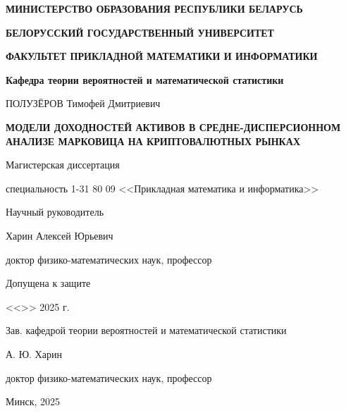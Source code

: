 \begin{titlepage}
    \begin{center}
       \textbf{МИНИСТЕРСТВО ОБРАЗОВАНИЯ РЕСПУБЛИКИ БЕЛАРУСЬ}

       \textbf{БЕЛОРУССКИЙ ГОСУДАРСТВЕННЫЙ УНИВЕРСИТЕТ}

       \textbf{ФАКУЛЬТЕТ ПРИКЛАДНОЙ МАТЕМАТИКИ И ИНФОРМАТИКИ}

       \textbf{Кафедра теории вероятностей и математической статистики}
    \end{center}

    \vspace{15pt}

    \begin{center}
        ПОЛУЗЁРОВ Тимофей Дмитриевич
    \end{center}

    \begin{center}
        \textbf{МОДЕЛИ ДОХОДНОСТЕЙ АКТИВОВ В СРЕДНЕ-ДИСПЕРСИОННОМ АНАЛИЗЕ МАРКОВИЦА НА КРИПТОВАЛЮТНЫХ РЫНКАХ}
    \end{center}

    \begin{center}
        Магистерская диссертация

        специальность 1-31 80 09
        <<Прикладная математика и информатика>>
    \end{center}

    \vspace{10pt}

    \hfill
    \begin{minipage}{0.5\linewidth}
        \begin{flushleft}
            Научный руководитель
    
            Харин Алексей Юрьевич
    
            доктор физико-математических наук, профессор
    
        \end{flushleft}
    \end{minipage}

    \vspace{30pt}

    Допущена к защите

    <<\underline{\hspace{20pt}}>> \underline{\hspace{100pt}} 2025 г.

    Зав. кафедрой теории вероятностей и математической статистики

    \underline{\hspace{80pt}} А. Ю. Харин

    доктор физико-математических наук, профессор    

    \vspace{100pt}

    \begin{center}
        Минск, 2025
    \end{center}
\end{titlepage}
\setcounter{page}{2}